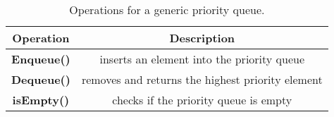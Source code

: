 \begin{table}[t]
\centering
\begin{tabular}{|c|c|}
\hline

\textbf{Operation}   & \textbf{Description}    \\ \hline

	\textbf{Enqueue()}       	& inserts an element into the priority queue                        \\ \hline
	\textbf{Dequeue()}		& removes and returns the highest priority element 		\\ \hline
	\textbf{isEmpty()}			& checks if the priority queue is empty 					\\ \hline

\end{tabular}
\caption{\footnotesize{Operations for a generic priority queue.}
\label{tab:PQ_API}}
\end{table}

